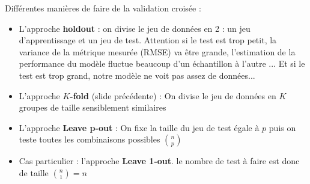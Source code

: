 \documentclass[10pt]{beamer}
\begin{document}
\begin{frame}
	Différentes manières de faire de la validation croisée :\\[3em]
	\begin{itemize}
		\item L'approche {\textbf{holdout}} : on divise le jeu de données en 2 : un jeu d'apprentissage et un jeu de test.
		Attention si le test est trop petit, la variance de la métrique mesurée (\eg RMSE) va être grande, \ie l’estimation de la performance du modèle fluctue beaucoup d'un échantillon à l'autre ... Et si le test est trop grand, notre modèle ne voit pas assez de données...\\[2em]
		\item L'approche \textbf{$K$-fold} (slide précédente) : On divise le jeu de données en $K$ groupes de taille sensiblement similaires\\[2em]
		\item L'approche \textbf{Leave p-out} : On fixe la taille du jeu de test égale à $p$ puis on teste toutes les combinaisons possibles  $\binom{n}{p}$\\[2em]
		\item Cas particulier : l'approche \textbf{Leave 1-out}. le nombre de test à faire est donc de taille $\binom{n}{1} = n$
	\end{itemize}
\end{frame}

\end{document}
